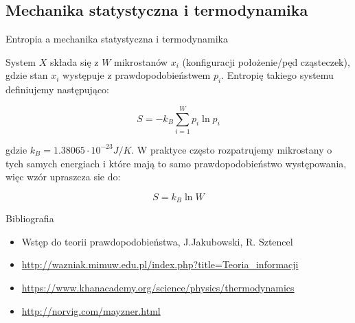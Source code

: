 \documentclass{beamer}
\begin{document}
\subsection{Mechanika statystyczna i termodynamika}

\begin{frame}{Entropia a mechanika statystyczna i termodynamika}

System $X$ składa się z $W$ mikrostanów $x_i$ (konfiguracji położenie/pęd cząsteczek), gdzie stan
$x_i$ występuje z prawdopodobieństwem $p_i$. Entropię takiego systemu definiujemy
następująco:

$$
S = - k_B \sum_{i=1}^{W} p_i \ln{p_i}
$$

gdzie $k_B = 1.38065 \cdot 10^{-23} J/K$.
W praktyce często rozpatrujemy mikrostany o tych samych energiach i które mają
to samo prawdopodobieństwo występowania, więc wzór upraszcza sie do:

$$
S = k_B \ln{W}
$$

\end{frame}

\begin{frame}{Bibliografia}
\begin{itemize}
  \item Wstęp do teorii prawdopodobieństwa, J.Jakubowski, R. Sztencel
  \item \url{http://wazniak.mimuw.edu.pl/index.php?title=Teoria_informacji}
  \item \url{https://www.khanacademy.org/science/physics/thermodynamics}
  \item \url{http://norvig.com/mayzner.html}
\end{itemize}
\end{frame}
\end{document}

